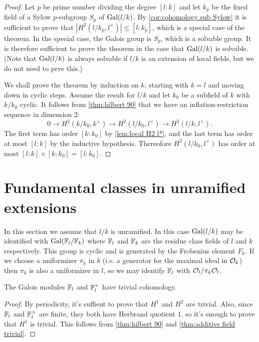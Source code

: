 \begin{proof}
	Let $p$ be prime number dividing the degree $[l:k]$ and let $k_p$ be the fixed field
	of a Sylow $p$-subgroup $S_p$ of $\mathrm{Gal}(l/k)$.
	By \ref{cor:cohomology sub Sylow} it is sufficient to prove that
	$|H^2(l/k_p,l^\times)| \le [l:k_p]$, which is a special case of the theorem.
	In the special case, the Galois group is $S_p$, which is a solvable group.
	It is therefore sufficient to prove the theorem in the case that $\mathrm{Gal}(l/k)$ is solvable.
	(Note that $\mathrm{Gal}(l/k)$ is always solvable if $l/k$ is an extension of local fields,
	but we do not need to prve this.)

	We shall prove the theorem by induction on $k$, starting with $k=l$ and moving down in
	cyclic steps. Assume the result for $l/k$ and let $k_0$ be a subfield of $k$ with $k/k_0$ cyclic.
	It follows from \ref{thm:hilbert 90} that
	we have an inflation-restriction sequence in dimension 2:
	\[
		0 \to H^2(k/k_0, k^\times) \to H^2( l/k_0, l^\times) \to H^2(l/k, l^\times).
	\]
	The first term has order $[k : k_0]$ by \ref{lem:local H2 l*}, and the last term has
	order at most $[l:k]$ by the inductive hypothesis.
	Thereofore $H^2( l/k_0, l^\times)$ has order at most $[l:k] \times [k : k_0] = [l: k_0]$.
\end{proof}







\section{Fundamental classes in unramified extensions}

In this section we assume that $l/k$ is unramified.
In this case $\mathrm{Gal}(l/k)$ may be identified with $\mathrm{Gal}({\mathbb F}_l / {\mathbb F}_k)$ where
${\mathbb F}_l$ and ${\mathbb F}_k$ are the residue class fields of $l$ and $k$ respectively.
This group is cyclic and is generated by the Frobenius element $F_k$.
If we choose a uniformizer $\pi_k$ in $k$ (i.e. a generator for the maximal ideal in ${\mathcal O}_k$)
then $\pi_k$ is also a uniformizer in $l$, so we may identify ${\mathbb F}_l$ with ${\mathcal O}_l / \pi_k {\mathcal O}_l$.

\begin{lemma} \label{lem:finite field trivial}
	The Galois modules ${\mathbb F}_l$ and ${\mathbb F}_l^\times$ have trivial cohomology.
\end{lemma}

\begin{proof}
	By periodicity, it's suffient to prove that $H^1$ and $H^2$ are trivial.
	Also, since ${\mathbb F}_l$ and ${\mathbb F}_l^\times$ are finite, they both have Herbrand quotient $1$,
	so it's enough to prove that $H^1$ is trivial.
	This follows from \ref{thm:hilbert 90} and \ref{thm:additive field trivial}.
\end{proof}


